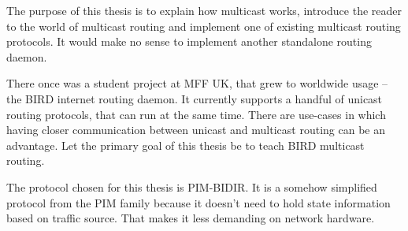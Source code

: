 The purpose of this thesis is to explain how multicast works, introduce the
reader to the world of multicast routing and implement one of existing
multicast routing protocols. It would make no sense to implement another
standalone routing daemon.

There once was a student project at MFF UK, that grew to worldwide usage -- the BIRD
internet routing daemon. It currently supports a handful of unicast routing
protocols, that can run at the same time. There are use-cases in which having closer communication
between unicast and multicast routing can be an advantage. Let the primary goal of
this thesis be to teach BIRD multicast routing.

The protocol chosen for this thesis is PIM-BIDIR. It is a somehow simplified
protocol from the PIM family because it doesn't need to hold state information
based on traffic source. That makes it less demanding on network hardware.
